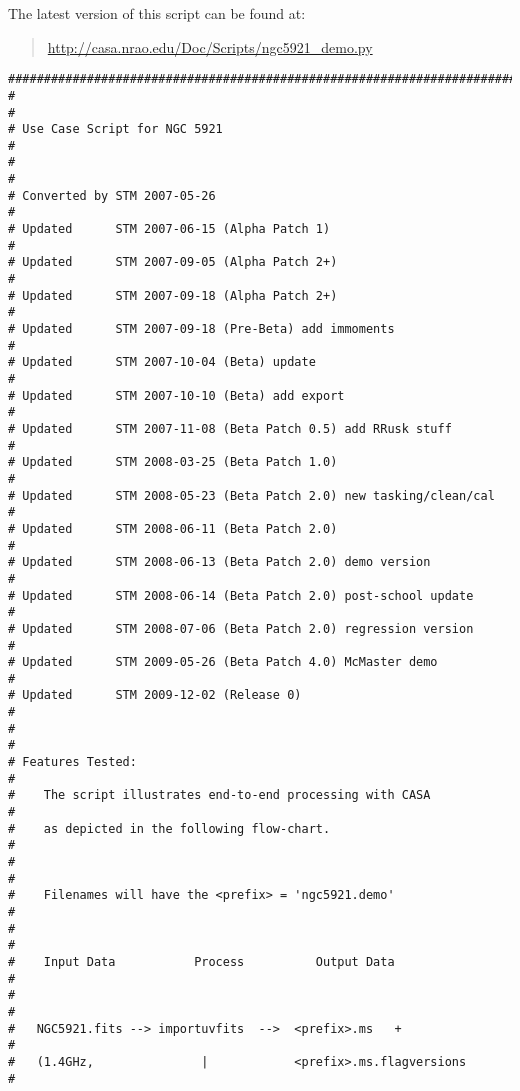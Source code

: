 The latest version of this script can be found at:
\begin{quote}
   \url{http://casa.nrao.edu/Doc/Scripts/ngc5921_demo.py}
\end{quote}

\small
\begin{verbatim}
##########################################################################
#                                                                        #
# Use Case Script for NGC 5921                                           #
#                                                                        #
# Converted by STM 2007-05-26                                            #
# Updated      STM 2007-06-15 (Alpha Patch 1)                            #
# Updated      STM 2007-09-05 (Alpha Patch 2+)                           #
# Updated      STM 2007-09-18 (Alpha Patch 2+)                           #
# Updated      STM 2007-09-18 (Pre-Beta) add immoments                   #
# Updated      STM 2007-10-04 (Beta) update                              #
# Updated      STM 2007-10-10 (Beta) add export                          #
# Updated      STM 2007-11-08 (Beta Patch 0.5) add RRusk stuff           #
# Updated      STM 2008-03-25 (Beta Patch 1.0)                           #
# Updated      STM 2008-05-23 (Beta Patch 2.0) new tasking/clean/cal     #
# Updated      STM 2008-06-11 (Beta Patch 2.0)                           #
# Updated      STM 2008-06-13 (Beta Patch 2.0) demo version              #
# Updated      STM 2008-06-14 (Beta Patch 2.0) post-school update        #
# Updated      STM 2008-07-06 (Beta Patch 2.0) regression version        #
# Updated      STM 2009-05-26 (Beta Patch 4.0) McMaster demo             #
# Updated      STM 2009-12-02 (Release 0)                                #
#                                                                        #
# Features Tested:                                                       #
#    The script illustrates end-to-end processing with CASA              #
#    as depicted in the following flow-chart.                            #
#                                                                        #
#    Filenames will have the <prefix> = 'ngc5921.demo'                   #
#                                                                        #
#    Input Data           Process          Output Data                   #
#                                                                        #
#   NGC5921.fits --> importuvfits  -->  <prefix>.ms   +                  #
#   (1.4GHz,               |            <prefix>.ms.flagversions         #

\end{verbatim}
